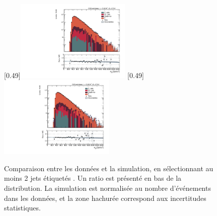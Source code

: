 \begin{figure}[p!] \centering
    [0.49\textwidth]{\includegraphics[width=0.49\textwidth,angle=-90,origin=c]{chapitre7/figs/data_mc/2btag/semimu/hmttSelected_btag_sel.pdf}} \hfill
    [0.49\textwidth]{\includegraphics[width=0.49\textwidth,angle=-90,origin=c]{chapitre7/figs/data_mc/2btag/semie/hmttSelected_btag_sel.pdf}}
    \caption{Comparaison entre les données et la simulation, en sélectionnant au moins 2 jets étiquetés \Pbottom{}. Un ratio est présenté en bas de la distribution. La simulation est normalisée au nombre d'événements dans les données, et la zone hachurée correspond aux incertitudes statistiques.}
    \label{fig:data_mc_2b}
\end{figure}
